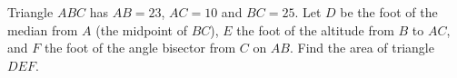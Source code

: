 Triangle $ABC$ has $AB=23$, $AC=10$ and $BC=25$. Let $D$ be the foot of the median from $A$ (the midpoint of $BC$), $E$ the foot of the altitude from $B$ to $AC$, and $F$ the foot of the angle bisector from $C$ on $AB$. Find the area of triangle $DEF$.
